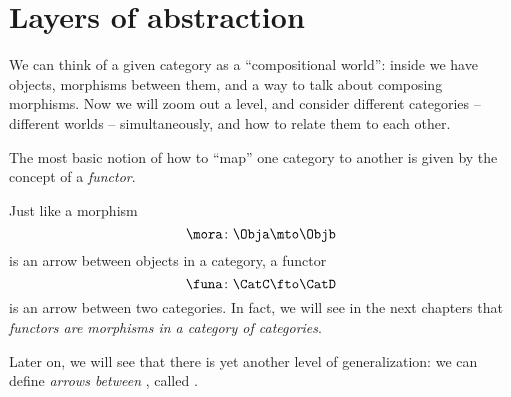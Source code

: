 
\section{Layers of abstraction}
\label{sec:functors}


We can think of a given category \CatC as a ``compositional world'': inside \CatC we have objects, morphisms between them, and a way to talk about composing morphisms.
Now we will zoom out a level, and consider different categories -- different worlds -- simultaneously, and how to relate them to each other.

The most basic notion of how to ``map'' one category to another is given by the concept of a \emph{functor}.

Just like a morphism
%
\begin{equation}
    \mora \colon \Obja \mto \Objb
\end{equation}
%
is an arrow between objects in a category, a functor
%
\begin{equation}
    \funa \colon \CatC \fto \CatD
\end{equation}
%
is an arrow between two categories.
In fact, we will see in the next chapters that \emph{functors are morphisms in a category of categories}.

Later on, we will see that there is yet another level of generalization: we can define \emph{arrows between }, called .

